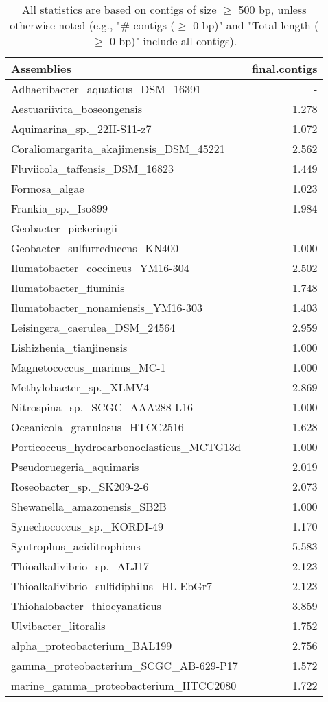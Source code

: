 \documentclass[12pt,a4paper]{article}
\begin{document}
\begin{table}[ht]
\begin{center}
\caption{All statistics are based on contigs of size $\geq$ 500 bp, unless otherwise noted (e.g., "\# contigs ($\geq$ 0 bp)" and "Total length ($\geq$ 0 bp)" include all contigs).}
\begin{tabular}{|l*{1}{|r}|}
\hline
Assemblies & final.contigs \\ \hline
Adhaeribacter\_aquaticus\_DSM\_16391 & - \\ \hline
Aestuariivita\_boseongensis & 1.278 \\ \hline
Aquimarina\_sp.\_22II-S11-z7 & 1.072 \\ \hline
Coraliomargarita\_akajimensis\_DSM\_45221 & 2.562 \\ \hline
Fluviicola\_taffensis\_DSM\_16823 & 1.449 \\ \hline
Formosa\_algae & 1.023 \\ \hline
Frankia\_sp.\_Iso899 & 1.984 \\ \hline
Geobacter\_pickeringii & - \\ \hline
Geobacter\_sulfurreducens\_KN400 & 1.000 \\ \hline
Ilumatobacter\_coccineus\_YM16-304 & 2.502 \\ \hline
Ilumatobacter\_fluminis & 1.748 \\ \hline
Ilumatobacter\_nonamiensis\_YM16-303 & 1.403 \\ \hline
Leisingera\_caerulea\_DSM\_24564 & 2.959 \\ \hline
Lishizhenia\_tianjinensis & 1.000 \\ \hline
Magnetococcus\_marinus\_MC-1 & 1.000 \\ \hline
Methylobacter\_sp.\_XLMV4 & 2.869 \\ \hline
Nitrospina\_sp.\_SCGC\_AAA288-L16 & 1.000 \\ \hline
Oceanicola\_granulosus\_HTCC2516 & 1.628 \\ \hline
Porticoccus\_hydrocarbonoclasticus\_MCTG13d & 1.000 \\ \hline
Pseudoruegeria\_aquimaris & 2.019 \\ \hline
Roseobacter\_sp.\_SK209-2-6 & 2.073 \\ \hline
Shewanella\_amazonensis\_SB2B & 1.000 \\ \hline
Synechococcus\_sp.\_KORDI-49 & 1.170 \\ \hline
Syntrophus\_aciditrophicus & 5.583 \\ \hline
Thioalkalivibrio\_sp.\_ALJ17 & 2.123 \\ \hline
Thioalkalivibrio\_sulfidiphilus\_HL-EbGr7 & 2.123 \\ \hline
Thiohalobacter\_thiocyanaticus & 3.859 \\ \hline
Ulvibacter\_litoralis & 1.752 \\ \hline
alpha\_proteobacterium\_BAL199 & 2.756 \\ \hline
gamma\_proteobacterium\_SCGC\_AB-629-P17 & 1.572 \\ \hline
marine\_gamma\_proteobacterium\_HTCC2080 & 1.722 \\ \hline
\end{tabular}
\end{center}
\end{table}
\end{document}
